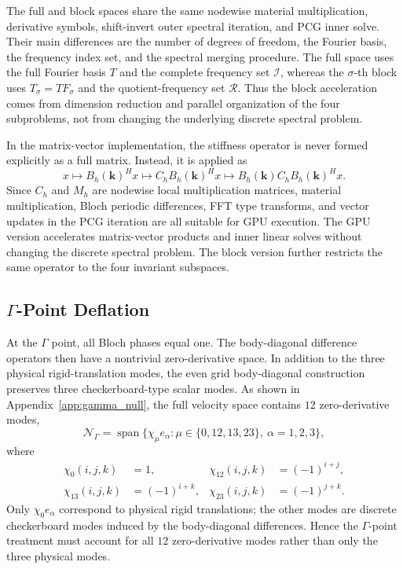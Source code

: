 \documentclass[11pt,oneside]{article}
\numberwithin{equation}{section}
\theoremstyle{plain}
\theoremstyle{remark}
\newcommand{\bk}{\bm{k}}
\begin{document}
The full and block spaces share the same nodewise material multiplication, derivative symbols, shift-invert outer spectral iteration, and PCG inner solve. Their main differences are the number of degrees of freedom, the Fourier basis, the frequency index set, and the spectral merging procedure. The full space uses the full Fourier basis \(T\) and the complete frequency set \(\mathcal I\), whereas the \(\sigma\)-th block uses \(T_\sigma=TF_\sigma\) and the quotient-frequency set \(\mathcal R\). Thus the block acceleration comes from dimension reduction and parallel organization of the four subproblems, not from changing the underlying discrete spectral problem.

In the matrix-vector implementation, the stiffness operator is never formed explicitly as a full matrix. Instead, it is applied as
\[
x\mapsto B_h(\bk)^Hx
\mapsto C_hB_h(\bk)^Hx
\mapsto B_h(\bk)C_hB_h(\bk)^Hx.
\]
Since \(C_h\) and \(M_h\) are nodewise local multiplication matrices, material multiplication, Bloch periodic differences, FFT type transforms, and vector updates in the PCG iteration are all suitable for GPU execution. The GPU version accelerates matrix-vector products and inner linear solves without changing the discrete spectral problem. The block version further restricts the same operator to the four invariant subspaces.

\subsection{\texorpdfstring{\(\Gamma\)-Point Deflation}{Gamma Point Deflation}}
\label{subsec:gamma_deflation}

At the \(\Gamma\) point, all Bloch phases equal one. The body-diagonal difference operators then have a nontrivial zero-derivative space. In addition to the three physical rigid-translation modes, the even grid body-diagonal construction preserves three checkerboard-type scalar modes. As shown in Appendix~\ref{app:gamma_null}, the full velocity space contains \(12\) zero-derivative modes,
\begin{equation}\label{eq:gamma_null_space_main}
\mathcal N_\Gamma
=
\operatorname{span}\{\chi_\mu e_\alpha:
\mu\in\{0,12,13,23\},\ \alpha=1,2,3\},
\end{equation}
where
\[
\begin{aligned}
\chi_0(i,j,k)&=1,
&\chi_{12}(i,j,k)&=(-1)^{i+j},\\
\chi_{13}(i,j,k)&=(-1)^{i+k},
&\chi_{23}(i,j,k)&=(-1)^{j+k}.
\end{aligned}
\]
Only \(\chi_0 e_\alpha\) correspond to physical rigid translations; the other modes are discrete checkerboard modes induced by the body-diagonal differences. Hence the \(\Gamma\)-point treatment must account for all \(12\) zero-derivative modes rather than only the three physical modes.
\end{document}

